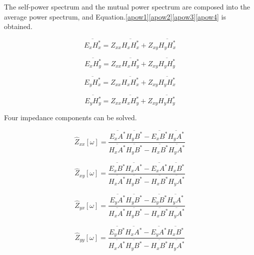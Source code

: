 \documentclass[9pt,a4paper,twoside]{rho-class/rho}
\begin{document}
The self-power spectrum and the mutual power spectrum are composed into the average power spectrum, and Equation.\eqref{apow1}\eqref{apow2}\eqref{apow3}\eqref{apow4} is obtained.

\begin{equation}
    \label{apow1}
    \overline{E_xH_x^\ast}=Z_{xx}\overline{H_xH_x^\ast}+Z_{xy}\overline{H_yH_x^\ast} 
\end{equation}

\begin{equation}
    \label{apow2}
    \overline{E_xH_y^\ast}=Z_{xx}\overline{H_xH_y^\ast}+Z_{xy}\overline{H_yH_y^\ast} 
\end{equation}

\begin{equation}
    \label{apow3}
    \overline{E_yH_x^\ast}=Z_{xx}\overline{H_xH_x^\ast}+Z_{xy}\overline{H_yH_x^\ast} 
\end{equation}

\begin{equation}
    \label{apow4}
    \overline{E_yH_y^\ast}=Z_{xx}\overline{H_xH_y^\ast}+Z_{xy}\overline{H_yH_y^\ast} 
\end{equation}

Four impedance components can be solved.

\begin{equation}
    \label{zxx}
    \hat{Z}_{xx}[\omega]=\dfrac{\overline{E_xA^\ast}\overline{H_yB^\ast}-\overline{E_xB^\ast}\overline{H_yA^\ast}}{\overline{H_xA^\ast}\overline{H_yB^\ast}-\overline{H_xB^\ast}\overline{H_yA^\ast}}
\end{equation}

\begin{equation}
    \label{zxy}
    \hat{Z}_{xy}[\omega]=\dfrac{\overline{E_xB^\ast}\overline{H_xA^\ast}-\overline{E_xA^\ast}\overline{H_xB^\ast}}{\overline{H_xA^\ast}\overline{H_yB^\ast}-\overline{H_xB^\ast}\overline{H_yA^\ast}}
\end{equation}

\begin{equation}
    \label{zyx}
    \hat{Z}_{yx}[\omega]=\dfrac{\overline{E_yA^\ast}\overline{H_yB^\ast}-\overline{E_yB^\ast}\overline{H_yA^\ast}}{\overline{H_xA^\ast}\overline{H_yB^\ast}-\overline{H_xB^\ast}\overline{H_yA^\ast}}
\end{equation}

\begin{equation}
    \label{zyy}
    \hat{Z}_{yy}[\omega]=\dfrac{\overline{E_yB^\ast}\overline{H_xA^\ast}-\overline{E_yA^\ast}\overline{H_xB^\ast}}{\overline{H_xA^\ast}\overline{H_yB^\ast}-\overline{H_xB^\ast}\overline{H_yA^\ast}}
\end{equation}
\end{document}
